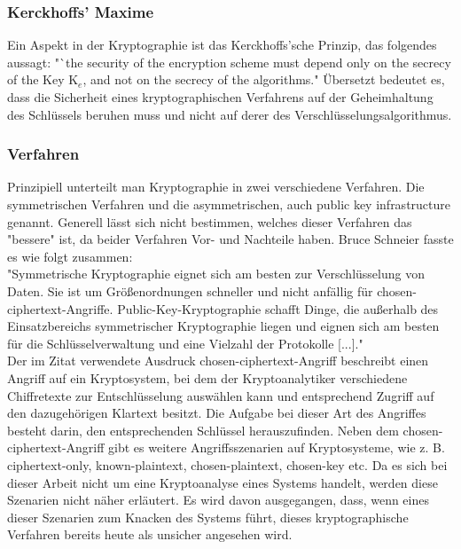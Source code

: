 \documentclass[10pt, a4paper,headsepline,pointednumbers]{scrreprt}
\begin{document}
\subsubsection{Kerckhoffs' Maxime}
Ein Aspekt in der Kryptographie ist das Kerckhoffs'sche Prinzip, das folgendes aussagt: "`the security of the encryption scheme must depend only on the secrecy of the Key K$_{e}$, and not on the secrecy of the algorithms." \citep[S. 23]{book:practical-crypto} Übersetzt bedeutet es, dass die Sicherheit eines kryptographischen Verfahrens  auf der Geheimhaltung des Schlüssels beruhen muss und nicht auf derer des Verschlüsselungsalgorithmus.


\subsubsection{Verfahren}
Prinzipiell unterteilt man Kryptographie in zwei verschiedene Verfahren. Die symmetrischen Verfahren und die asymmetrischen, auch public key infrastructure genannt. Generell lässt sich nicht bestimmen, welches dieser Verfahren das "bessere" ist, da beider Verfahren Vor- und Nachteile haben. Bruce Schneier fasste es wie folgt zusammen: \\
"Symmetrische Kryptographie eignet sich am besten zur Verschlüsselung von Daten. Sie ist um Größenordnungen schneller und nicht anfällig für chosen-ciphertext-Angriffe. Public-Key-Kryptographie schafft Dinge, die außerhalb des Einsatzbereichs symmetrischer Kryptographie liegen und eignen sich am besten für die Schlüsselverwaltung und eine Vielzahl der Protokolle [...]." \citep[S. 254f]{book:angewandte-krypto} \\ 
Der im Zitat verwendete Ausdruck chosen-ciphertext-Angriff beschreibt einen Angriff auf ein Kryptosystem, bei dem der Kryptoanalytiker verschiedene Chiffretexte zur Entschlüsselung auswählen kann und entsprechend Zugriff auf den dazugehörigen Klartext besitzt. Die Aufgabe bei dieser Art des Angriffes besteht darin, den entsprechenden Schlüssel herauszufinden. \citep[S. 7]{book:angewandte-krypto}
Neben dem chosen-ciphertext-Angriff gibt es weitere Angriffsszenarien auf Kryptosysteme, wie z. B. ciphertext-only, known-plaintext, chosen-plaintext, chosen-key etc. Da es sich bei dieser Arbeit nicht um eine Kryptoanalyse eines Systems handelt, werden diese Szenarien nicht näher erläutert. Es wird davon ausgegangen, dass, wenn eines dieser Szenarien zum Knacken des Systems führt, dieses kryptographische Verfahren bereits heute als unsicher angesehen wird.
\end{document}
